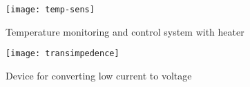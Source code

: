 \begin{figure}[htpb]
\centering
\texttt{[image: temp-sens]}
\caption{Temperature monitoring and control system with heater}
\label{fig:temp-sens}
\end{figure}

\begin{figure}[htpb]
\centering
\texttt{[image: transimpedence]}
\caption{Device for converting low current to voltage}
\label{fig:transimpedence}
\end{figure}
